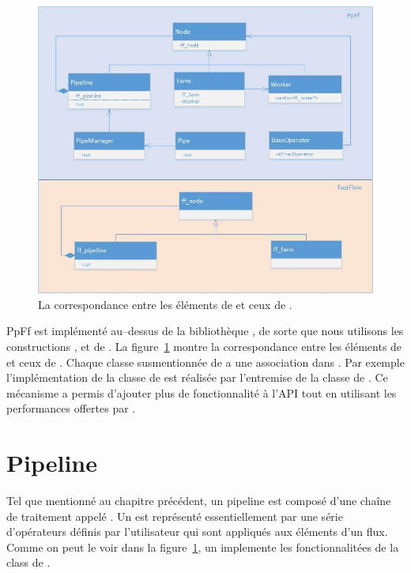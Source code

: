 \begin{figure}[ht]
\centering
     \includegraphics[width=1.0\textwidth]{Figures/MapToFastFlow.jpg}
      \caption{La correspondance entre les \'el\'ements de  et ceux de  .}
       \label{MapToFastFlow.fig}
\end{figure}

PpFf est impl\'ement\'e au--dessus de la biblioth\`eque , de sorte que nous utilisons les constructions ,  et  de . La figure~\ref{MapToFastFlow.fig} montre la correspondance entre les \'el\'ements de  et ceux de . Chaque classe susmentionn\'ee de  a une association dans . Par exemple l'impl\'ementation de la classe  de  est r\'ealis\'ee par l'entremise de la classe  de . Ce m\'ecanisme a permis d'ajouter plus de fonctionnalit\'e \`a l'API tout en utilisant les performances offertes par .

\section{Pipeline}

Tel que mentionn\'e au chapitre pr\'ec\'edent, un pipeline est compos\'e d'une cha\^ine de traitement appel\'e . Un  est repr\'esent\'e essentiellement par une s\'erie d'op\'erateurs d\'efinis par l'utilisateur qui sont appliqu\'es aux \'el\'ements d'un flux. Comme on peut le voir dans la figure~\ref{MapToFastFlow.fig}, un  implemente les fonctionnalit\'ees de la class  de . 

